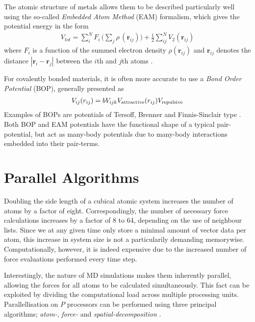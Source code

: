 The atomic structure of metals allows them to be described particularly well using the so-called \textit{Embedded Atom Method} (EAM) formalism, which gives the potential energy in the form
\begin{align}
V_{tot} = \sum_i^N F_i\, \bigg( \sum_j \rho\, (\mathbf{r}_{ij}) \bigg) + \frac{1}{2} \sum^N_{ij} V_2 (\mathbf{r}_{ij})
\end{align}
where  $F_i$ is a function of the summed electron density $\rho (\mathbf{r}_{ij})$ and $\mathbf{r}_{ij}$ denotes the distance $| \mathbf{r}_i - \mathbf{r}_j |$ between the $i$th and $j$th atoms \cite{EAMmodel,dudarevEAMpotential}. 

For covalently bonded materials, it is often more accurate to use a \textit{Bond Order Potential} (BOP), generally presented as
\begin{align}
V_{ij}(r_{ij}) =bV_{ijk}V_{\rm attractive}(r_{ij}) V_ {\rm repulsive}
\end{align}
Examples of BOPs are potentials of Tersoff, Brenner and Finnis-Sinclair type \cite{tersoff1988new, brenner1990empirical, finnis1984simple}. Both BOP and EAM potentials have the functional shape of a typical pair-potential, but act as many-body potentials due to many-body interactions embedded into their pair-terms.

\section{Parallel Algorithms}
Doubling the side length of a cubical atomic system increases the number of atoms by a factor of eight. 
Correspondingly, the number of necessary force calculations increases by a factor of  8 to 64, depending on the use of neighbour lists.
Since we at any given time only store a minimal amount of vector data per atom, this increase in system size is not a particularily demanding memorywise.
Computationally, however, it is indeed expensive due to the increased number of force evaluations performed every time step.

Interestingly, the nature of MD simulations makes them inherently parallel, allowing the forces for all atoms to be calculated simultaneously. 
This fact can be exploited by dividing the computational load across multiple processing units. 
Parallellisation on $P$ processors can be performed using three principal algorithms; \textit{atom-}, \textit{force-} and \textit{spatial-decomposition} 
\cite{fincham1987parallel}.

